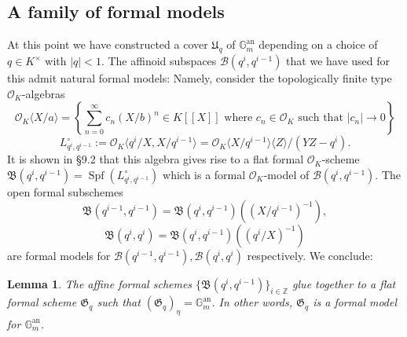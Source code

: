 \documentclass[10pt,oneside]{amsart}
\newtheorem{lemma}[theorem]{Lemma}
\theoremstyle{definition}
\begin{document}
	\subsection{A family of formal models}
	At this point we have constructed a cover $\mathfrak U_q$ of $\mathbb G_m^{\operatorname{an}}$ depending on a choice of $q\in K^\times$ with $|q|<1$. 
	The affinoid subspaces $\mathcal B(q^i,q^{i-1})$ that we have used for this admit natural formal models: Namely, consider the topologically finite type $\mathcal O_K$-algebras
	\[\mathcal O_K\langle X/a\rangle = \left\{\sum_{n=0}^{\infty} c_n (X/b)^n\in K[[X]] \text{ where } c_n\in \mathcal O_K \text{ such that } |c_n|\to 0 \right\}\]
	\[L_{q^i,q^{i-1}}^\circ :=\mathcal O_K\langle q^i/X, X/q^{i-1}\rangle = \mathcal O_K\langle X/q^{i-1}\rangle\langle Z\rangle/(YZ-q^i).\]
	It is shown in \cite{Bosch lectures} \S 9.2 that this algebra gives rise to a flat formal $\mathcal O_K$-scheme $\mathfrak B(q^i,q^{i-1})=\operatorname{Spf}(L_{q^i,q^{i-1}}^\circ)$ which is a formal $\mathcal O_K$-model of $\mathcal B(q^i,q^{i-1})$. The open formal subschemes 
	\[\mathfrak B(q^{i-1},q^{i-1})=\mathfrak B(q^i,q^{i-1})((X/q^{i-1})^{-1}),\]
	\[\mathfrak B(q^{i},q^{i})=\mathfrak B(q^i,q^{i-1})((q^{i}/X)^{-1})\]		
	are formal models for $\mathcal B(q^{i-1},q^{i-1}), \mathcal B(q^i,q^i)$ respectively. We conclude:

	\begin{lemma}\label{formal model of torus}
		The affine formal schemes $\{\mathfrak B(q^i,q^{i-1})\}_{i\in\mathbb Z}$ glue together to a flat formal scheme $\mathfrak G_q$ such that $(\mathfrak G_q)_\eta = \mathbb G_m^{\operatorname{an}}$. In other words, $\mathfrak G_q$ is a formal model for $\mathbb G_m^{\operatorname{an}}$.
	\end{lemma}
	
\end{document}
